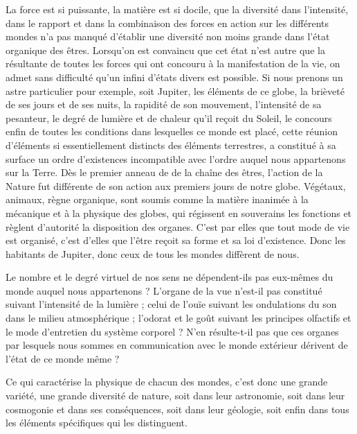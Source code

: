 \documentclass[a4paper, 11pt, oneside]{article}
\begin{document}
La force est si puissante, la matière est si docile, que la diversité dans l'intensité, dans le rapport et dans la combinaison des forces en action sur les différents mondes n'a pas manqué d'établir une diversité non moins grande dans l'état organique des êtres. Lorsqu'on est convaincu que cet état n'est autre que la résultante de toutes les forces qui ont concouru à la manifestation de la vie, on admet sans difficulté qu'un infini d'états divers est possible. Si nous prenons un astre particulier pour exemple, soit Jupiter, les éléments de ce globe, la brièveté de ses jours et de ses nuits, la rapidité de son mouvement, l'intensité de sa pesanteur, le degré de lumière et de chaleur qu'il reçoit du Soleil, le concours enfin de toutes les conditions dans lesquelles ce monde est placé, cette réunion d'éléments si essentiellement distincts des éléments terrestres, a constitué à sa surface un ordre d'existences incompatible avec l'ordre auquel nous appartenons sur la Terre. Dès le premier anneau de de la chaîne des êtres, l'action de la Nature fut différente de son action aux premiers jours de notre globe. Végétaux, animaux, règne organique, sont soumis comme la matière inanimée à la mécanique et à la physique des globes, qui régissent en souverains les fonctions et règlent d'autorité la disposition des organes. C'est par elles que tout mode de vie est organisé, c'est d'elles que l'être reçoit sa forme et sa loi d'existence. Donc les habitants de Jupiter, donc ceux de tous les mondes diffèrent de nous.

Le nombre et le degré virtuel de nos sens ne dépendent-ils pas eux-mêmes du monde auquel nous appartenons ? L'organe de la vue n'est-il pas constitué suivant l'intensité de la lumière ; celui de l'ouïe suivant les ondulations du son dans le milieu atmosphérique ; l'odorat et le goût suivant les principes olfactifs et le mode d'entretien du système corporel ? N'en résulte-t-il pas que ces organes par lesquels nous sommes en communication avec le monde extérieur dérivent de l'état de ce monde même ?

Ce qui caractérise la physique de chacun des mondes, c'est donc une grande variété, une grande diversité de nature, soit dans leur astronomie, soit dans leur cosmogonie et dans ses conséquences, soit dans leur géologie, soit enfin dans tous les éléments spécifiques qui les distinguent.
\end{document}
